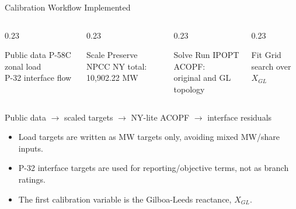 \documentclass[aspectratio=169,10pt]{beamer}
\begin{document}
\begin{frame}{Calibration Workflow Implemented}
\begin{columns}[T,onlytextwidth]
\begin{column}{0.23\linewidth}
\begin{block}{Public data}
\scriptsize P-58C zonal load\\
P-32 interface flow
\end{block}
\end{column}
\begin{column}{0.23\linewidth}
\begin{block}{Scale}
\scriptsize Preserve NPCC NY total:\\
10,902.22 MW
\end{block}
\end{column}
\begin{column}{0.23\linewidth}
\begin{block}{Solve}
\scriptsize Run IPOPT ACOPF:\\
original and GL topology
\end{block}
\end{column}
\begin{column}{0.23\linewidth}
\begin{block}{Fit}
\scriptsize Grid search over\\
$X_{GL}$
\end{block}
\end{column}
\end{columns}

\vspace{0.2em}
\begin{center}
\small Public data $\rightarrow$ scaled targets $\rightarrow$ NY-lite ACOPF $\rightarrow$ interface residuals
\end{center}

\vspace{1em}
\begin{itemize}
  \item Load targets are written as MW targets only, avoiding mixed MW/share inputs.
  \item P-32 interface targets are used for reporting/objective terms, not as branch ratings.
  \item The first calibration variable is the Gilboa-Leeds reactance, $X_{GL}$.
\end{itemize}
\end{frame}
\end{document}
